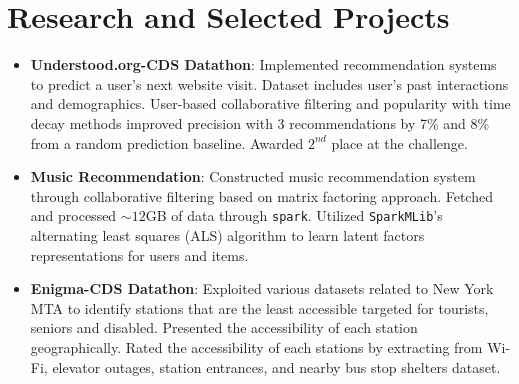 \documentclass[letterpaper,11pt]{article}
\newcommand{\resumeItem}[2]{
  \item\small{
    \textbf{#1}{: #2 \vspace{-2pt}}
  }
}
\newcommand{\resumeSubHeadingListStart}{\begin{itemize}[leftmargin=*]}
\newcommand{\resumeSubHeadingListEnd}{\end{itemize}}
\begin{document}
%

 
 

\section{Research and Selected Projects}
\resumeSubHeadingListStart

\resumeItem{Understood.org-CDS Datathon}{Implemented recommendation systems to predict a user's next website visit. Dataset includes user's past interactions and demographics. User-based collaborative filtering and popularity with time decay methods improved precision with 3 recommendations by 7\% and 8\% from a random prediction baseline. Awarded $2^{nd}$ place at the challenge.}

\resumeItem{Music Recommendation}
      {Constructed music recommendation system through collaborative filtering based on matrix factoring approach. Fetched and processed ${\sim} 12$GB of data through \texttt{spark}. Utilized \texttt{SparkMLib}'s alternating least squares (ALS) algorithm to learn latent factors representations for users and items.}
      
\resumeItem{Enigma-CDS Datathon}
      {Exploited various datasets related to New York MTA to identify stations that are the least accessible targeted for tourists, seniors and disabled. Presented the accessibility of each station geographically. Rated the accessibility of each stations by extracting from Wi-Fi, elevator outages, station entrances, and nearby bus stop shelters dataset.}
      
   

\resumeSubHeadingListEnd
\end{document}
